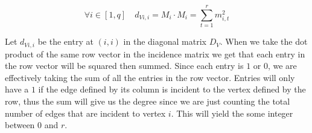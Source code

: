 \documentclass{article}
\begin{document}
\begin{equation}
    \forall i \in[1, q]\quad
    d_{V {i, i}} = M_i \cdot M_i = \sum_{t = 1}^{r}m_{i, t}^2
\end{equation}

Let $d_{V {i, i}}$ be the entry at $(i, i)$ in the diagonal matrix $D_V$.
When we take the dot product of the same row vector in the incidence matrix
we get that each entry in the row vector will be squared then summed. Since
each entry is $1$ or $0$, we are effectively taking the sum of all the
entries in the row vector. Entries will only have a $1$ if the edge defined
by its column is incident to the vertex defined by the row, thus the sum
will give us the degree since we are just counting the total number of edges
that are incident to vertex $i$. This will yield the some integer between $0$
and $r$.
\end{document}
